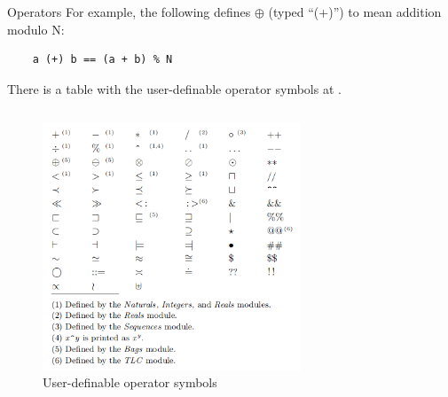 \documentclass[10pt]{beamer}
\begin{document}
\begin{frame}{Operators}
  For example, the following defines \textbf{$\oplus$} (typed ``(+)'') to mean addition modulo N:

  \begin{verbatim}
    a (+) b == (a + b) % N
  \end{verbatim}
  
  There is a table with the user-definable operator symbols at \cite{PlusCal-Manual}.

  \framebreak

  \begin{columns}[T,onlytextwidth]
      \centering
      \begin{figure}      
        \includegraphics[width=0.9\textwidth]{figures/user-definable-operator-symbols.png}
        \caption{User-definable operator symbols}
      \end{figure}
      \centering
      \begin{figure}

\end{figure}
\end{columns}
\end{frame}
\end{document}
